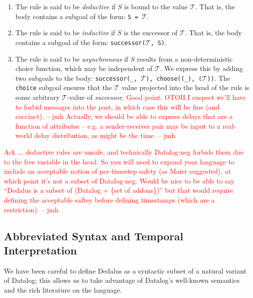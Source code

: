 \documentclass{acm_proc_article-sp-sigmod09}
\newcommand{\Tau}{\mathcal{T}}
\newcommand{\jmh}[1]{{\textcolor{red}{#1 -- jmh}}}
\newcommand{\wrm}[1]{{\color{BurntOrange}{#1 -- wrm}}}
\newcommand{\dedalus}[1]{\texttt{\fontsize{9pt}{9pt}\selectfont #1}}
\begin{document}
\begin{enumerate}

\item The rule is said to be \emph{deductive} if $S$ is
bound to the value $\Tau$.  That is, the body contains a subgoal of the form:
\dedalus{S = $\Tau$}.

\item The rule is said to be {\em inductive} if $S$ is the successor
of $\Tau$.  That is, the body contains a subgoal of the form:
\dedalus{successor($\Tau$, S)}.

\item The rule is said to be {\em asynchronous} if $S$ results from a non-deterministic choice function, which may be independent of $\Tau$.  We express this by adding two subgoals
to the body: \dedalus{successor(\_, $\Tau$), choose((\_), ($\Tau$))}.  The
\dedalus{choice} subgoal ensures that the $\Tau$ value projected into the head of
the rule is some arbitrary $\Tau$-value of \emph{successor}. \wrm{Why can't we
select the initial time?  What we should do instead is have some unary relation
time(T) that captures all possible times, and choose from this relation
instead.  We can assume an inclusion constraint forcing successor's arguments
to both come from this relation.}  \jmh{Good point.  OTOH I suspect we'll have to forbid messages into the past, in which case this will be fine (and succinct).}  \jmh{Actually, we should be able to express delays that are a function of attributes -- e.g. a sender-receiver pair may be input to a real-world delay distribution, as might be the time.}

\end{enumerate}

\jmh{Ack ... deductive rules are unsafe, and technically Datalog-neg forbids them due to the free variable in the head.  So you will need to expand your language to include an acceptable notion of per-timestep safety (as Maier suggested), at which point it's not a subset of Datalog-neg.  Would be nice to be able to say ``Dedalus is a subset of (Datalog + \{set of addons\})'' but that would require defining the acceptable saftey before defining timestamps (which are a restriction).}

\subsection{Abbreviated Syntax and Temporal Interpretation}
We have been careful to define Dedalus as a syntactic subset of a natural variant of Datalog; this allows us to take advantage of Datalog's well-known semantics and the rich literature on the language.  
\end{document}

